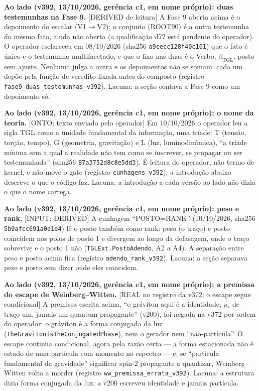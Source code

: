 \documentclass[11pt]{article}
\theoremstyle{definition}\newtheorem{deriv}{Derivação}
\begin{document}
\textbf{Ao lado (v392, 13/10/2026, gerência c1, em nome próprio): duas testemunhas na Fase 9.} \textsf{[DERIVED de leitura]} A Fase 9 aberta acima é o depoimento do escalar (V1$\to$V2); o conjunto (ROOT90) é a outra testemunha do mesmo fato, ainda não aberta (a qualificação d72 está pendente do operador). O operador esclareceu em 08/10/2026 (sha256 \texttt{a9cecc128f40c101}) que o fato é único e o testemunho multifacetado, e que o fixo nas duas é o Verbo, $\beta_{\mathrm{TGL}}$, posto sem ajuste. Nenhuma julga a outra e os depoimentos não se somam: cada um depõe pela função de veredito fixada antes do composto (registro \texttt{fase9\_duas\_testemunhas\_v392}). Lacuna: a seção contava a Fase 9 como um depoimento só.

\textbf{Ao lado (v392, 13/10/2026, gerência c1, em nome próprio): o nome da teoria.} \textsf{[ONTO; texto enviado pelo operador]} Em 10/10/2026 o operador leu a sigla TGL como a unidade fundamental da informação, uma tríade: T (tensão, torção, tempo), G (geometria, gravitação) e L (luz, luminodinâmica), ``a tríade mínima sem a qual a realidade não tem como se inscrever, se propagar ou ser testemunhada'' (sha256 \texttt{87a3752d8c8e5dd3}). É leitura do operador, não termo de kernel, e não move o gate (registro \texttt{cunhagens\_v392}); a introdução abaixo descreve o que o código faz. Lacuna: a introdução a cada versão ao lado não dizia o que o nome carrega.

 \textbf{Ao lado (v392, 13/10/2026, gerência c1, em nome próprio): peso e rank.} \textsf{[INPUT; DERIVED]} A cunhagem ``POSTO=RANK'' (10/10/2026, sha256 \texttt{5b9afcc691a0e1e4}) lê o posto também como rank: peso (o traço) e posto coincidem nos polos de posto 1 e divergem ao longo da defasagem, onde o traço sobrevive e o posto 1 não (\texttt{TGLExt.PostoAdendo}, A2 a A4). A separação entre peso e posto acima fica (registro \texttt{adendo\_rank\_v392}). Lacuna: a seção separava peso e posto sem dizer onde eles coincidem.

 \textbf{Ao lado (v392, 13/10/2026, gerência c1, em nome próprio): a premissa do escape de Weinberg--Witten.} \textsf{[REAL no registro da v372; o escape segue condicional]} A premissa escrita acima, ``o gráviton aqui é a identidade, $\rho_\ast$ de traço um, jamais um quantum propagante'' (v200), foi negada na v372 por ordem do operador: o gráviton é a forma conjugada da luz (\texttt{TheGravitonIsTheConjugatedPhase}), nem o gerador nem ``não-partícula''. O escape continua condicional, agora pela razão certa --- a forma estacionada não é estado de uma partícula com momento no espectro --- e, se ``partícula fundamental da gravidade'' significar spin-2 propagante a quantizar, Weinberg--Witten volta a morder (registro \texttt{ww\_premissa\_errata\_v392}). Lacuna: a estrutura dizia forma conjugada da luz; a v200 escreveu identidade e jamais partícula.
\end{document}
